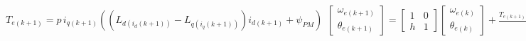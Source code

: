 \begin{subequations}
	\begin{equation}
		T_{e(k+1)}  = p\, i_{q(k+1)}((L_{d(i_d(k+1))} - L_{q(i_q(k+1))})i_{d(k+1)} + \psi_{PM})
	\end{equation}

	\begin{equation}
		\begin{aligned}
			\begin{bmatrix}
				\omega_{e(k+1)} \\
				\theta_{e(k+1)}
			\end{bmatrix}
			=
			\begin{bmatrix}
				1 & 0 \\
				h & 1
			\end{bmatrix}
			\begin{bmatrix}
				\omega_{e(k)} \\
				\theta_{e(k)}
			\end{bmatrix}
			+
			\frac{T_{e(k+1)}-T_{load(k+1)} - T_{loss(k+1)}}{J}
			\begin{bmatrix}
				h \\
				h^2
			\end{bmatrix}
		\end{aligned}
	\end{equation}
	\label{eq:motor_backward_euler_matrix}
\end{subequations}